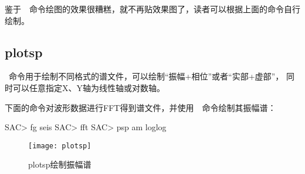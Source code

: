 鉴于~~命令绘图的效果很糟糕，就不再贴效果图了，读者可以根据上面的命令自行绘制。

\subsection{plotsp}
~命令用于绘制不同格式的谱文件，可以绘制``振幅+相位''或者``实部+虚部''，
同时可以任意指定X、Y轴为线性轴或对数轴。

下面的命令对波形数据进行FFT得到谱文件，并使用~~命令绘制其振幅谱：
\begin{SACCode}
SAC> fg seis
SAC> fft
SAC> psp am loglog
\end{SACCode}

\begin{figure}[H]
\centering
\texttt{[image: plotsp]}
\caption{plotsp绘制振幅谱}
\label{fig:plotsp}
\end{figure}
